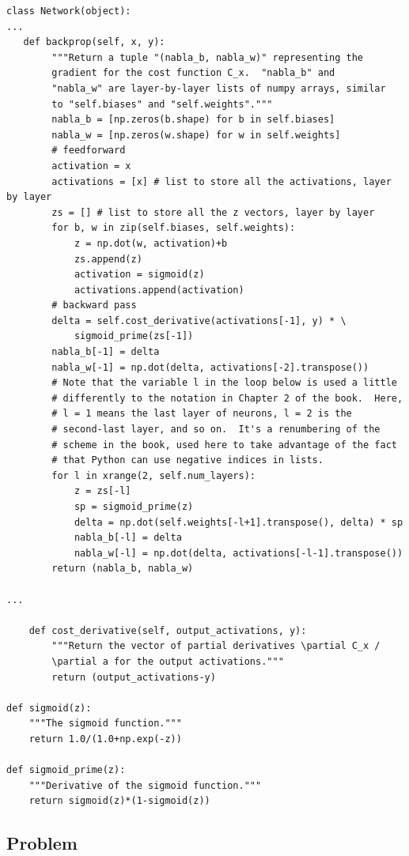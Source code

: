 \begin{lstlisting}
class Network(object):
...
   def backprop(self, x, y):
        """Return a tuple "(nabla_b, nabla_w)" representing the
        gradient for the cost function C_x.  "nabla_b" and
        "nabla_w" are layer-by-layer lists of numpy arrays, similar
        to "self.biases" and "self.weights"."""
        nabla_b = [np.zeros(b.shape) for b in self.biases]
        nabla_w = [np.zeros(w.shape) for w in self.weights]
        # feedforward
        activation = x
        activations = [x] # list to store all the activations, layer by layer
        zs = [] # list to store all the z vectors, layer by layer
        for b, w in zip(self.biases, self.weights):
            z = np.dot(w, activation)+b
            zs.append(z)
            activation = sigmoid(z)
            activations.append(activation)
        # backward pass
        delta = self.cost_derivative(activations[-1], y) * \
            sigmoid_prime(zs[-1])
        nabla_b[-1] = delta
        nabla_w[-1] = np.dot(delta, activations[-2].transpose())
        # Note that the variable l in the loop below is used a little
        # differently to the notation in Chapter 2 of the book.  Here,
        # l = 1 means the last layer of neurons, l = 2 is the
        # second-last layer, and so on.  It's a renumbering of the
        # scheme in the book, used here to take advantage of the fact
        # that Python can use negative indices in lists.
        for l in xrange(2, self.num_layers):
            z = zs[-l]
            sp = sigmoid_prime(z)
            delta = np.dot(self.weights[-l+1].transpose(), delta) * sp
            nabla_b[-l] = delta
            nabla_w[-l] = np.dot(delta, activations[-l-1].transpose())
        return (nabla_b, nabla_w)

...

    def cost_derivative(self, output_activations, y):
        """Return the vector of partial derivatives \partial C_x /
        \partial a for the output activations."""
        return (output_activations-y) 

def sigmoid(z):
    """The sigmoid function."""
    return 1.0/(1.0+np.exp(-z))

def sigmoid_prime(z):
    """Derivative of the sigmoid function."""
    return sigmoid(z)*(1-sigmoid(z))
\end{lstlisting}

\subsection*{Problem}
\label{subs: Problem Fully matrix-based approach}


